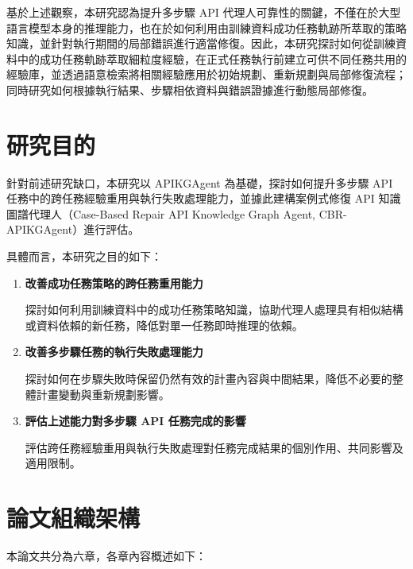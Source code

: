 基於上述觀察，本研究認為提升多步驟 API 代理人可靠性的關鍵，不僅在於大型語言模型本身的推理能力，也在於如何利用由訓練資料成功任務軌跡所萃取的策略知識，並針對執行期間的局部錯誤進行適當修復。因此，本研究探討如何從訓練資料中的成功任務軌跡萃取細粒度經驗，在正式任務執行前建立可供不同任務共用的經驗庫，並透過語意檢索將相關經驗應用於初始規劃、重新規劃與局部修復流程；同時研究如何根據執行結果、步驟相依資料與錯誤證據進行動態局部修復。

\section{研究目的}
針對前述研究缺口，本研究以 APIKGAgent 為基礎，探討如何提升多步驟 API 任務中的跨任務經驗重用與執行失敗處理能力，並據此建構案例式修復 API 知識圖譜代理人（Case-Based Repair API Knowledge Graph Agent, CBR-APIKGAgent）進行評估。

具體而言，本研究之目的如下：

\begin{enumerate}
\item \textbf{改善成功任務策略的跨任務重用能力}

探討如何利用訓練資料中的成功任務策略知識，協助代理人處理具有相似結構或資料依賴的新任務，降低對單一任務即時推理的依賴。

\item \textbf{改善多步驟任務的執行失敗處理能力}

探討如何在步驟失敗時保留仍然有效的計畫內容與中間結果，降低不必要的整體計畫變動與重新規劃影響。

\item \textbf{評估上述能力對多步驟 API 任務完成的影響}

評估跨任務經驗重用與執行失敗處理對任務完成結果的個別作用、共同影響及適用限制。
\end{enumerate}


\section{論文組織架構}

本論文共分為六章，各章內容概述如下：

